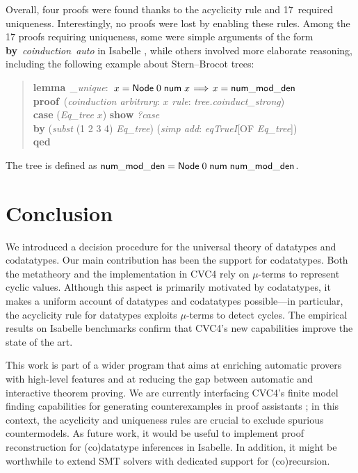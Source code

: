 \documentclass[smallcondensed,draft]{svjour3}
\newcommand\keyw[1]{\textbf{#1}}
\newcommand\const[1]{\textsf{#1}}
\newcommand\vthinspace{\kern+0.083333em}
\begin{document}
%
Overall, four proofs were found thanks to
the acyclicity rule and 17~required uniqueness. Interestingly,
no proofs were lost by enabling these rules. Among the 17 proofs requiring uniqueness,
some were simple arguments of the form
\keyw{by}~\textit{coinduction}~\textit{auto}
in Isabelle \cite{blanchette-et-al-2014-impl}, while others
involved more elaborate reasoning, including the following example
about Stern--Brocot trees:
%
\begin{quote}
\keyw{lemma} \,\textit{\nummodden\_unique}: \,$x = \const{Node}\;0\;\const{num}\; x \vthinspace\Longrightarrow\vthinspace x = \const{\nummodden}$ \\
\keyw{proof} \,(\textit{coinduction arbitrary}: $x$ \textit{rule}: \textit{tree.coinduct\_strong}) \\
\noindent\hbox{}\quad  \keyw{case} (\textit{Eq\_tree} $x$) \keyw{show} \textit{?case} \\
\noindent\hbox{}\qquad  \keyw{by} (\textit{subst} (1 2 3 4) \textit{Eq\_tree}) (\textit{simp add}: \textit{eqTrueI}[OF \textit{Eq\_tree}]) \\
\keyw{qed}
\end{quote}
%
\noindent
The tree \const{\nummodden} is defined as $\const{\nummodden} =
\const{Node}\;0\;\const{num}\;\const{\nummodden}$.

\section{Conclusion}
\label{sec:conclusion}

We introduced a decision procedure for the universal theory of datatypes and
codatatypes. Our main
contribution has been the support for codatatypes. Both the metatheory and
the implementation in CVC4 rely on $\mu$-terms to represent cyclic values.
Although this aspect is primarily motivated by codatatypes, it makes
a uniform account of datatypes and codatatypes possible---in particular,
the acyclicity rule for datatypes exploits $\mu$-terms to detect cycles.
The empirical results on Isabelle benchmarks
confirm that CVC4's new capabilities improve the state of the art.

This work is part of a wider program that aims at enriching automatic provers
with high-level features and at reducing the gap between automatic and
interactive theorem proving.
We are currently interfacing CVC4's finite model finding capabilities
for generating counterexamples in proof assistants
\cite{reynolds-et-al-2015-smt};
in this context, the acyclicity and uniqueness rules are
crucial to exclude spurious countermodels.
As future work, it would be useful to implement
proof reconstruction for (co)data\-type inferences in Isabelle.
In addition, it might be worthwhile to
extend SMT solvers with dedicated support for (co)recursion.
\end{document}
